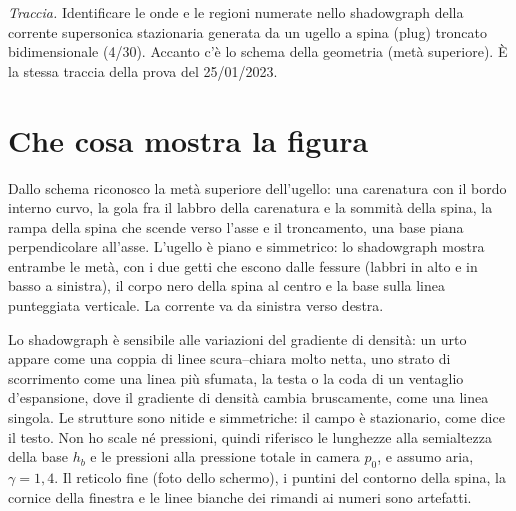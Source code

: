 

\graphicspath{{../../svolgimenti/1970-02-01_E03_ugello_spina_troncata/figure/}}



\maketitle

\emph{Traccia.} Identificare le onde e le regioni numerate nello shadowgraph della corrente supersonica stazionaria
generata da un ugello a spina (plug) troncato bidimensionale (4/30). Accanto c'è lo schema della geometria (metà
superiore). È la stessa traccia della prova del 25/01/2023.

\section*{Che cosa mostra la figura}
Dallo schema riconosco la metà superiore dell'ugello: una carenatura con il bordo interno curvo, la gola fra il
labbro della carenatura e la sommità della spina, la rampa della spina che scende verso l'asse e il troncamento, una
base piana perpendicolare all'asse. L'ugello è piano e simmetrico: lo shadowgraph mostra entrambe le metà, con i due
getti che escono dalle fessure (labbri in alto e in basso a sinistra), il corpo nero della spina al centro e la base
sulla linea punteggiata verticale. La corrente va da sinistra verso destra.

Lo shadowgraph è sensibile alle variazioni del gradiente di densità: un urto appare come una coppia di linee
scura--chiara molto netta, uno strato di scorrimento come una linea più sfumata, la testa o la coda di un ventaglio
d'espansione, dove il gradiente di densità cambia bruscamente, come una linea singola. Le strutture sono nitide e
simmetriche: il campo è stazionario, come dice il testo. Non ho scale né pressioni, quindi riferisco le lunghezze
alla semialtezza della base $h_b$ e le pressioni alla pressione totale in camera $p_0$, e assumo aria,
$\gamma=1{,}4$. Il reticolo fine (foto dello schermo), i puntini del contorno della spina, la cornice della finestra
e le linee bianche dei rimandi ai numeri sono artefatti.

